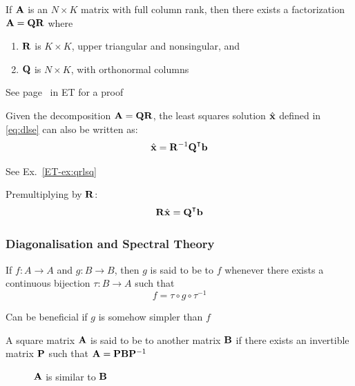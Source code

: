 \begin{frame}

     \vspace{2em}
    \Thm{\eqref{ET-t:qr}}
    If $\mathbf A$ is an $N \times K$ matrix with full column rank, then there exists a
    factorization $\mathbf A = \mathbf Q \mathbf R$ where
    \begin{enumerate}
        \item $\mathbf R$ is $K \times K$, upper triangular and nonsingular, and 
        \item $\mathbf Q$ is $N \times K$, with orthonormal columns
    \end{enumerate}
    See page~\pageref{ET-t:qr} in ET for a proof
    
\end{frame}

\begin{frame}

     \vspace{2em}
    Given the decomposition $\mathbf A = \mathbf Q \mathbf R$, the least squares solution
    $\hat {\mathbf x}$ defined in \eqref{eq:dlse} can also be written as:
    $$\hboldx =
    \boldR^{-1} \boldQ^\T \boldb$$
    
    See Ex.~\ref{ET-ex:qrlsq}
    
    \vspace{.7em}
    Premultiplying by $\mathbf R$:
    $$\boldR \hboldx = \boldQ^\T \boldb$$
    
\end{frame}

\begin{frame}\frametitle{Diagonalisation and Spectral Theory}

     \vspace{2em}
    If $f \colon A \to A$ and $g \colon B \to B$, then
    $g$ is said to be  to $f$ whenever there exists
    a continuous bijection $\tau \colon B \to A$ such that $$f = \tau \circ g \circ
    \tau^{-1}$$
    
    \vspace{.7em}
    Can be beneficial if $g$ is somehow simpler
    than $f$
    
\end{frame}

\begin{frame}

    \vspace{2em}
    A square matrix $\mathbf A$ is said to be  to another matrix $\mathbf B$ if there exists an invertible matrix $\mathbf P$ such that $\mathbf A = \mathbf P \mathbf B \mathbf P^{-1}$

    \begin{figure}
   \begin{center}
    
    \caption{\label{f:diagonalize} $\mathbf A$ is similar to $\mathbf B$}
   \end{center}
    \end{figure}
    
\end{frame}

